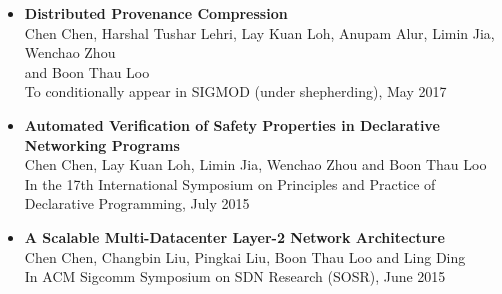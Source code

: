 \vspace{15pt} %
\begin{itemize} \itemsep -2pt %
\item {\bf Distributed Provenance Compression} \\
Chen Chen, Harshal Tushar Lehri, Lay Kuan Loh, Anupam Alur, Limin Jia,
Wenchao Zhou \\ and Boon Thau Loo\\
To conditionally appear in SIGMOD (under shepherding), May 2017\\
\item {\bf Automated Verification of Safety Properties in Declarative Networking
    Programs} \\
Chen Chen, Lay Kuan Loh, Limin Jia, Wenchao Zhou and Boon Thau Loo\\
In the 17th International Symposium on Principles and Practice of Declarative
Programming, July 2015\\
\item {\bf A Scalable Multi-Datacenter Layer-2 Network Architecture} \\
Chen Chen, Changbin Liu, Pingkai Liu, Boon Thau Loo and Ling Ding\\
In ACM Sigcomm Symposium on SDN Research (SOSR), June 2015\\



\end{itemize}
